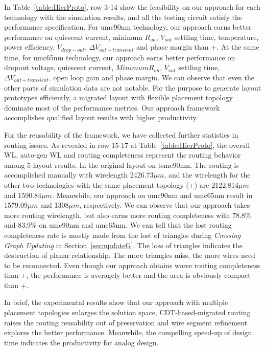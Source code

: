       

      In Table~\ref{table:HierProto}, row 3-14 show the feasibility on our approach for each technology with the simulation results, and all the testing circuit satisfy the performance specification. For umc90nm technology, our approach earns better performance on quiescent current, minimum $R_{on}$, $V_{out}$ settling time, temperature, power efficiency, $V_{drop-out}$, $\Delta V_{out-transient}$ and phase margin than \cite{msc-bhattacharya-tcad06}+\cite{Chin_DMR_ICCAD2013}. At the same time, for umc65nm technology, our approach earns better performance on dropout voltage, quiescent current, $Minimum R_{on}$, $V_{out}$ settling time, $\Delta V_{out-transient}$, open loop gain and phase margin. We can observe that even the other parts of simulation data are not notable. For the purpose to generate layout prototypes efficiently, a migrated layout with flexible placement topology dominate most of the performance metrics. Our approach framework accomplishes qualified layout results with higher productivity.

    
      For the reusability of the framework, we have collected further statistics in routing issues. As revealed in row 15-17 at Table~\ref{table:HierProto}, the overall WL, auto-gen WL and routing completeness represent the routing behavior among 5 layout results. In the original layout on tsmc90nm. The routing is accomplished manually with wirelength 2426.73$\mu m$, and the wirelength for the other two technologies with the same placement topology (\cite{msc-bhattacharya-tcad06}+\cite{Chin_DMR_ICCAD2013}) are 2122.814$\mu m$ and 1590.84$\mu m$. Meanwhile, our approach on umc90nm and umc65nm result in 1579.09$\mu m$ and 1308$\mu m$, respectively. We can observe that our approach takes more routing wirelength, but also earns more routing completeness with 78.8\% and 83.9\% on umc90nm and umc65nm. We can tell that the lost routing completeness rate is mostly made from the lost of triangles during {\it Crossing Graph Updating} in Section~\ref{sec:updateG}. The loss of triangles indicates the destruction of planar relationship. The more triangles miss, the more wires need to be reconnected. Even though our approach obtains worse routing completeness than \cite{msc-bhattacharya-tcad06}+\cite{Chin_DMR_ICCAD2013}, the performance is averagely better and the area is obviously compact than \cite{msc-bhattacharya-tcad06}+\cite{Chin_DMR_ICCAD2013}.

    In brief, the experimental results show that our approach with multiple placement topologies enlarges the solution space, CDT-based-migrated routing raises the routing reusability out of preservation and wire segment refinement explores the better performance. Meanwhile, the compelling speed-up of design time indicates the productivity for analog design.

